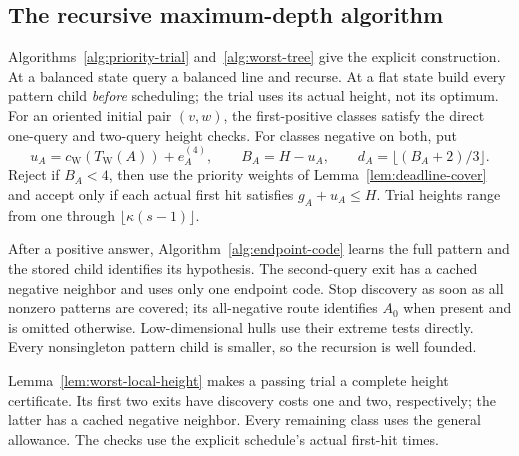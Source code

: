 

\subsection{The recursive maximum-depth algorithm}

Algorithms~\ref{alg:priority-trial} and~\ref{alg:worst-tree} give the
explicit construction. At a balanced state query a balanced line and
recurse. At a flat state build every pattern child \emph{before}
scheduling; the trial uses its actual height, not its optimum. For an
oriented initial pair $(v,w)$, the first-positive classes satisfy the
direct one-query and two-query height checks. For classes negative on
both, put
\[
 u_A=c_{\mathrm W}(T_{\mathrm W}(A))+e_A^{(4)},\qquad
 B_A=H-u_A,\qquad d_A=\lfloor(B_A+2)/3\rfloor.
\]
Reject if $B_A<4$, then use the priority weights of
Lemma~\ref{lem:deadline-cover} and accept only if each actual first hit
satisfies $g_A+u_A\le H$. Trial heights range from one through
$\lfloor\kappa(s-1)\rfloor$.

After a positive answer, Algorithm~\ref{alg:endpoint-code} learns the
full pattern and the stored child identifies its hypothesis. The
second-query exit has a cached negative neighbor and uses only one
endpoint code. Stop discovery as soon as all nonzero patterns are
covered; its all-negative route identifies $A_0$ when present and is
omitted otherwise. Low-dimensional hulls use their extreme tests
directly. Every nonsingleton pattern child is smaller, so the recursion
is well founded.

Lemma~\ref{lem:worst-local-height} makes a passing trial a complete
height certificate. Its first two exits have discovery costs one
and two, respectively; the latter has a cached negative neighbor.
Every remaining class uses the general allowance. The checks use
the explicit schedule's actual first-hit times.




